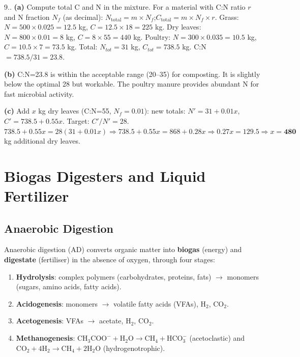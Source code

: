 \documentclass[12pt,a4paper,openany]{book}
\newcounter{exoctr}[chapter]
\renewcommand{\theexoctr}{\thechapter.\arabic{exoctr}}
\begin{document}
\begin{solbox}{9.\theexoctr}
\textbf{(a)} Compute total C and N in the mixture.
For a material with C:N ratio $r$ and N fraction $N_f$ (as decimal):
$N_{\text{total}} = m\times N_f$;\quad$C_{\text{total}} = m\times N_f\times r$.
Grass: $N=500\times0.025=12.5$ kg, $C=12.5\times18=225$ kg.
Dry leaves: $N=800\times0.01=8$ kg, $C=8\times55=440$ kg.
Poultry: $N=300\times0.035=10.5$ kg, $C=10.5\times7=73.5$ kg.
Total: $N_{tot}=31$ kg, $C_{tot}=738.5$ kg. C:N$=738.5/31=\mathbf{23.8}$.

\textbf{(b)} C:N=23.8 is within the acceptable range (20--35) for composting. It is slightly below the optimal 28 but workable. The poultry manure provides abundant N for fast microbial activity.

\textbf{(c)} Add $x$ kg dry leaves (C:N=55, $N_f=0.01$): new totals: $N'=31+0.01x$, $C'=738.5+0.55x$. Target: $C'/N'=28$.
$738.5+0.55x=28(31+0.01x)\Rightarrow738.5+0.55x=868+0.28x\Rightarrow0.27x=129.5\Rightarrow x=\mathbf{480}$ kg additional dry leaves.
\end{solbox}

\chapter{Biogas Digesters and Liquid Fertilizer}
\label{chap:biogas}

\section{Anaerobic Digestion}

Anaerobic digestion (AD) converts organic matter into \textbf{biogas} (energy) and \textbf{digestate} (fertiliser) in the absence of oxygen, through four stages:
\begin{enumerate}[leftmargin=2em]
  \item \textbf{Hydrolysis}: complex polymers (carbohydrates, proteins, fats) $\to$ monomers (sugars, amino acids, fatty acids).
  \item \textbf{Acidogenesis}: monomers $\to$ volatile fatty acids (VFAs), $\text{H}_2$, $\text{CO}_2$.
  \item \textbf{Acetogenesis}: VFAs $\to$ acetate, $\text{H}_2$, $\text{CO}_2$.
  \item \textbf{Methanogenesis}: $\text{CH}_3\text{COO}^- + \text{H}_2\text{O} \to \text{CH}_4 + \text{HCO}_3^-$ (acetoclastic) and $\text{CO}_2+4\text{H}_2\to\text{CH}_4+2\text{H}_2\text{O}$ (hydrogenotrophic).
\end{enumerate}
\end{document}
